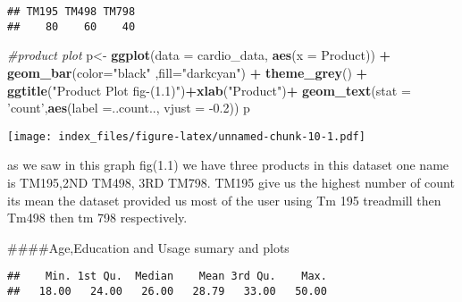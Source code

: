 \documentclass[
]{article}
\newenvironment{Shaded}{\begin{snugshade}}{\end{snugshade}}
\newcommand{\CommentTok}[1]{\textcolor[rgb]{0.56,0.35,0.01}{\textit{#1}}}
\newcommand{\DataTypeTok}[1]{\textcolor[rgb]{0.13,0.29,0.53}{#1}}
\newcommand{\FloatTok}[1]{\textcolor[rgb]{0.00,0.00,0.81}{#1}}
\newcommand{\KeywordTok}[1]{\textcolor[rgb]{0.13,0.29,0.53}{\textbf{#1}}}
\newcommand{\NormalTok}[1]{#1}
\newcommand{\OperatorTok}[1]{\textcolor[rgb]{0.81,0.36,0.00}{\textbf{#1}}}
\newcommand{\StringTok}[1]{\textcolor[rgb]{0.31,0.60,0.02}{#1}}
\begin{document}
\begin{verbatim}
## TM195 TM498 TM798 
##    80    60    40
\end{verbatim}

\begin{Shaded}
\begin{Highlighting}[]
\CommentTok{#product plot }
\NormalTok{p<-}\StringTok{ }\KeywordTok{ggplot}\NormalTok{(}\DataTypeTok{data =}\NormalTok{ cardio_data, }\KeywordTok{aes}\NormalTok{(}\DataTypeTok{x =}\NormalTok{ Product)) }\OperatorTok{+}\StringTok{ }
\StringTok{  }\KeywordTok{geom_bar}\NormalTok{(}\DataTypeTok{color=}\StringTok{"black"}\NormalTok{ ,}\DataTypeTok{fill=}\StringTok{"darkcyan"}\NormalTok{) }\OperatorTok{+}
\StringTok{  }\KeywordTok{theme_grey}\NormalTok{() }\OperatorTok{+}\StringTok{ }\KeywordTok{ggtitle}\NormalTok{(}\StringTok{"Product Plot    fig-(1.1)"}\NormalTok{)}\OperatorTok{+}\KeywordTok{xlab}\NormalTok{(}\StringTok{"Product"}\NormalTok{)}\OperatorTok{+}
\StringTok{  }\KeywordTok{geom_text}\NormalTok{(}\DataTypeTok{stat =} \StringTok{'count'}\NormalTok{,}\KeywordTok{aes}\NormalTok{(}\DataTypeTok{label =}\NormalTok{..count.., }\DataTypeTok{vjust =} \FloatTok{-0.2}\NormalTok{))}
\NormalTok{p}
\end{Highlighting}
\end{Shaded}

\texttt{[image: index\_files/figure-latex/unnamed-chunk-10-1.pdf]}

as we saw in this graph fig(1.1) we have three products in this dataset
one name is TM195,2ND TM498, 3RD TM798. TM195 give us the highest number
of count its mean the dataset provided us most of the user using Tm 195
treadmill then Tm498 then tm 798 respectively.

\#\#\#\#Age,Education and Usage sumary and plots

\begin{Shaded}
\end{Shaded}

\begin{verbatim}
##    Min. 1st Qu.  Median    Mean 3rd Qu.    Max. 
##   18.00   24.00   26.00   28.79   33.00   50.00
\end{verbatim}

\begin{Shaded}
\end{Shaded}
\end{document}
